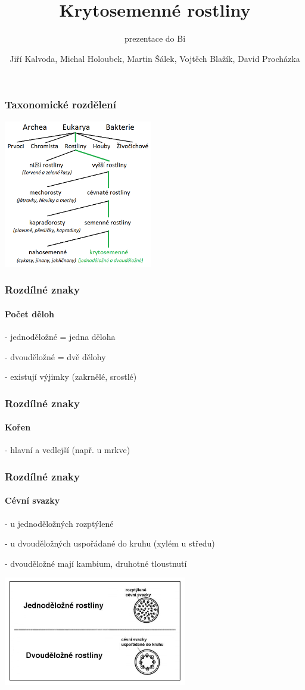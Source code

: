 \documentclass{beamer}
\title[Krytosemenné rostliny]{Krytosemenné rostliny}
\subtitle[prezentace do Bi]{prezentace do Bi}
\author{Jiří Kalvoda, Michal Holoubek, Martin Šálek, Vojtěch Blažík, David Procházka}
\date{}
\begin{document}

\begin{frame}
  \titlepage
\end{frame}

\begin{frame}
\frametitle{Taxonomické rozdělení}

\begin{center}\includegraphics[width=6.5cm]{1.png}\end{center}

\end{frame}
\begin{frame}

\frametitle{Rozdílné znaky}
	\framesubtitle{Počet děloh}

- jednoděložné = jedna děloha

- dvouděložné = dvě dělohy

- existují výjimky (zakrnělé, srostlé)

\end{frame}
\begin{frame}
\frametitle{Rozdílné znaky}
	\framesubtitle{Kořen}

- hlavní a vedlejší (např. u mrkve)

\end{frame}
\begin{frame}
\frametitle{Rozdílné znaky}
	\framesubtitle{Cévní svazky}
- u jednoděložných rozptýlené

- u dvouděložných uspořádané do kruhu (xylém u středu)

- dvouděložné mají kambium, druhotné tloustnutí

\begin{center}\includegraphics[width=8cm]{3.png}\end{center}

\end{frame}
\end{document}
